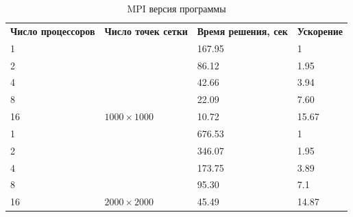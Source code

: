 \documentclass[12pt, a4paper]{article}
\begin{document}
        \begin{table}[H]
            \centering
            \caption{MPI версия программы}
            \label{tab:lom_mpi_low}
            \begin{tabular}{llll}
            \rowcolor[HTML]{C0C0C0}
            \textbf{Число процессоров} & \textbf{Число точек сетки}           & \textbf{Время решения, сек} & \textbf{Ускорение} \\
            \rowcolor[HTML]{EFEFEF}
            1                          &                                      & 167.95                      & 1                  \\
            2                          &                                      & 86.12                       & 1.95               \\
            4                          &                                      & 42.66                       & 3.94               \\
            8                          &                                      & 22.09                       & 7.60               \\
            16                         & \multirow{-4}{*}{$1000 \times 1000$} & 10.72                       & 15.67              \\
            \rowcolor[HTML]{EFEFEF}
            1                          &                                      & 676.53                      & 1                  \\
            2                          &                                      & 346.07                      & 1.95               \\
            4                          &                                      & 173.75                      & 3.89               \\
            8                          &                                      & 95.30                       & 7.1                \\
            16                         & \multirow{-4}{*}{$2000 \times 2000$} & 45.49                       & 14.87
            \end{tabular}
        \end{table}
\end{document}
